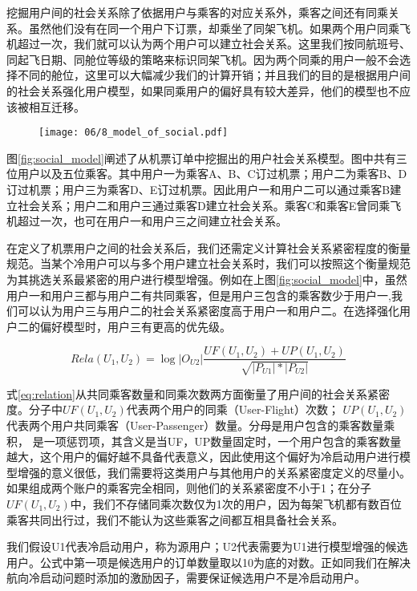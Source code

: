 挖掘用户间的社会关系除了依据用户与乘客的对应关系外，乘客之间还有同乘关系。虽然他们没有在同一个用户下订票，却乘坐了同架飞机。如果两个用户同乘飞机超过一次，我们就可以认为两个用户可以建立社会关系。这里我们按同航班号、同起飞日期、同舱位等级的策略来标识同架飞机。因为两个同乘的用户一般不会选择不同的舱位，这里可以大幅减少我们的计算开销；并且我们的目的是根据用户间的社会关系强化用户模型，如果同乘用户的偏好具有较大差异，他们的模型也不应该被相互迁移。

\begin{figure}
 \centering
 \texttt{[image: 06/8\_model\_of\_social.pdf]}
\end{figure}

图\ref{fig:social_model}阐述了从机票订单中挖掘出的用户社会关系模型。图中共有三位用户以及五位乘客。其中用户一为乘客A、B、C订过机票；用户二为乘客B、D订过机票；用户三为乘客D、E订过机票。因此用户一和用户二可以通过乘客B建立社会关系；用户二和用户三通过乘客D建立社会关系。乘客C和乘客E曾同乘飞机超过一次，也可在用户一和用户三之间建立社会关系。

在定义了机票用户之间的社会关系后，我们还需定义计算社会关系紧密程度的衡量规范。当某个冷用户可以与多个用户建立社会关系时，我们可以按照这个衡量规范为其挑选关系最紧密的用户进行模型增强。例如在上图\ref{fig:social_model}中，虽然用户一和用户三都与用户二有共同乘客，但是用户三包含的乘客数少于用户一,我们可以认为用户三与用户二的社会关系紧密度高于用户一和用户二。在选择强化用户二的偏好模型时，用户三有更高的优先级。

\begin{equation}
\label{eq:relation}
	Rela(U_1,U_2) = \log|O_{U2}| \frac{UF(U_1,U_2) + UP(U_1,U_2)}{\sqrt{|P_{U1}|*|P_{U2}|}}
\end{equation}

式\ref{eq:relation}从共同乘客数量和同乘次数两方面衡量了用户间的社会关系紧密度。分子中$UF(U_1,U_2)$代表两个用户的同乘（User-Flight）次数；
$UP(U_1,U_2)$代表两个用户共同乘客（User-Passenger）数量。分母是用户包含的乘客数量乘积，
是一项惩罚项，其含义是当UF，UP数量固定时，一个用户包含的乘客数量越大，这个用户的偏好越不具备代表意义，因此使用这个偏好为冷启动用户进行模型增强的意义很低，我们需要将这类用户与其他用户的关系紧密度定义的尽量小。如果组成两个账户的乘客完全相同，则他们的关系紧密度不小于1；在分子$UF(U_1,U_2)$中，我们不存储同乘次数仅为1次的用户，因为每架飞机都有数百位乘客共同出行过，我们不能认为这些乘客之间都互相具备社会关系。

我们假设U1代表冷启动用户，称为源用户；U2代表需要为U1进行模型增强的候选用户。公式中第一项是候选用户的订单数量取以10为底的对数。正如同我们在解决航向冷启动问题时添加的激励因子，需要保证候选用户不是冷启动用户。

